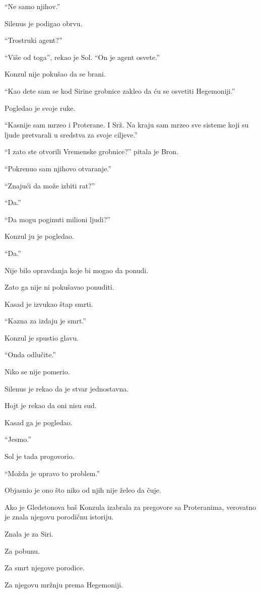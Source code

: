 ``Ne samo njihov.''

Silenus je podigao obrvu.

``Trostruki agent?''

``Više od toga'', rekao je Sol. ``On je agent osvete.''

Konzul nije pokušao da se brani.

``Kao dete sam se kod Sirine grobnice zakleo da ću se osvetiti Hegemoniji.''

Pogledao je svoje ruke.

``Kasnije sam mrzeo i Proterane. I Srž. Na kraju sam mrzeo sve sisteme koji su ljude pretvarali u sredstva za svoje ciljeve.''

``I zato ste otvorili Vremenske grobnice?'' pitala je Bron.

``Pokrenuo sam njihovo otvaranje.''

``Znajući da može izbiti rat?''

``Da.''

``Da mogu poginuti milioni ljudi?''

Konzul ju je pogledao.

``Da.''

Nije bilo opravdanja koje bi mogao da ponudi.

Zato ga nije ni pokušavao ponuditi.

\bigskip

Kasad je izvukao štap smrti.

``Kazna za izdaju je smrt.''

Konzul je spustio glavu.

``Onda odlučite.''

Niko se nije pomerio.

Silenus je rekao da je stvar jednostavna.

Hojt je rekao da oni nisu sud.

Kasad ga je pogledao.

``Jesmo.''

Sol je tada progovorio.

``Možda je upravo to problem.''

Objasnio je ono što niko od njih nije želeo da čuje.

Ako je Gledstonova baš Konzula izabrala za pregovore sa Proteranima, verovatno je znala njegovu porodičnu istoriju.

Znala je za Siri.

Za pobunu.

Za smrt njegove porodice.

Za njegovu mržnju prema Hegemoniji.

